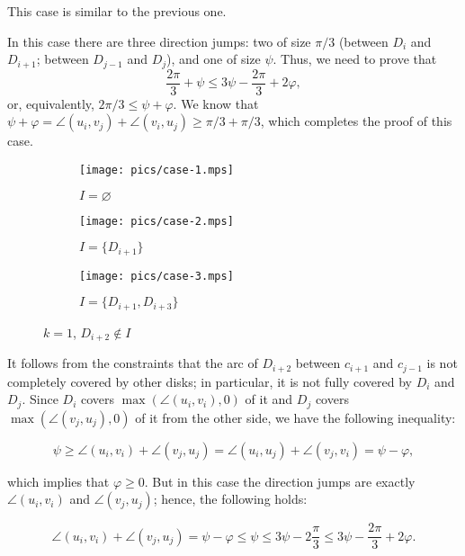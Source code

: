 \begin{enumerate}[label={\bf Case \arabic*: }, wide, labelwidth=!, labelindent=0pt]

This case is similar to the previous one.


In this case there are three direction jumps: two of size $\pi/3$ (between $D_i$ and $D_{i+1}$; between $D_{j-1}$ and $D_j$), and one of size $\psi$. Thus, we need to prove that
$$\frac{2\pi}{3} + \psi \leq 3\psi - \frac{2\pi}{3} + 2\varphi,$$
or, equivalently, $2\pi/3\leq \psi + \varphi$.
We know that $\psi + \varphi = \angle(u_i, v_j) + \angle(v_i, u_j) \ge \pi/3 + \pi/3$, which completes the proof of this case.

\begin{figure}[h!]
    \centering
    \begin{subfigure}[t]{.3\textwidth}
    \texttt{[image: pics/case-1.mps]}
    \caption{$I = \varnothing$}
    \end{subfigure}
    \begin{subfigure}[t]{.3\textwidth}
    \texttt{[image: pics/case-2.mps]}
    \caption{$I = \{D_{i+1}\}$}
    \end{subfigure}
    \begin{subfigure}[t]{.3\textwidth}
    \texttt{[image: pics/case-3.mps]}
    \caption{$I = \{D_{i+1}, D_{i+3}\}$}
    \end{subfigure}
    \caption{$k = 1$, $D_{i+2}\notin I$}
\end{figure}


It follows from the constraints that the arc of $D_{i+2}$ between $c_{i+1}$ and $c_{j-1}$ is not completely covered by other disks; in particular, it is not fully covered by $D_i$ and $D_j$. Since $D_i$ covers $\max(\angle(u_i, v_i), 0)$ of it and $D_j$ covers $\max(\angle(v_j, u_j), 0)$ of it from the other side, we have the following inequality:

$$\psi\geq\angle(u_i, v_i) + \angle(v_j, u_j) = \angle(u_i, u_j) + \angle(v_j, v_i) = \psi - \varphi,$$

which implies that $\varphi\geq 0$. But in this case the direction jumps are exactly $\angle(u_i, v_i)$ and $\angle(v_j, u_j)$; hence, the following holds:

$$\angle(u_i, v_i) + \angle(v_j, u_j) = \psi - \varphi \leq \psi \leq 3\psi - 2\frac{\pi}{3} \leq 3\psi - \frac{2\pi}{3} + 2\varphi.$$


\end{enumerate}

